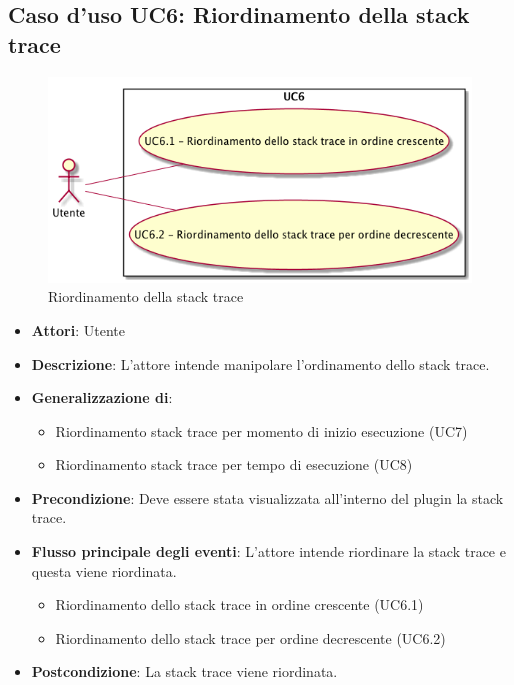 \subsection{Caso d'uso UC6: Riordinamento della stack trace}
\begin{figure} [H]
	\centering
	\includegraphics[scale=0.45]{./UC/UC6.png}
	\caption{Riordinamento della stack trace}\label{}
\end{figure}
\begin{itemize}
	\item \textbf{Attori}: Utente
	\item \textbf{Descrizione}: L'attore intende manipolare l'ordinamento dello stack trace.
	\item 	\textbf{Generalizzazione di}:
	\begin{itemize}
		\item Riordinamento stack trace per momento di inizio esecuzione (UC7)
		\item Riordinamento stack trace per tempo di esecuzione (UC8)
	\end{itemize}
	\item \textbf{Precondizione}: Deve essere stata visualizzata all'interno del plugin la stack trace.
	\item \textbf{Flusso principale degli eventi}: L'attore intende riordinare la stack trace e questa viene riordinata.
	
	\begin{itemize}
		\item Riordinamento dello stack trace in ordine crescente (UC6.1)
		\item Riordinamento dello stack trace per ordine decrescente (UC6.2)
	\end{itemize}
	\item \textbf{Postcondizione}: La stack trace viene riordinata.
\end{itemize}

